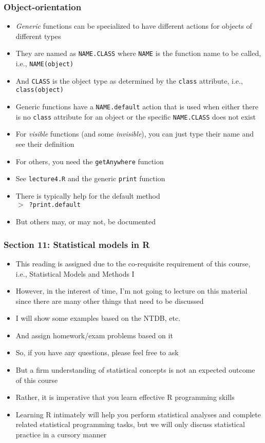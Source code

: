 \documentclass[11pt,pdftex,dvipsnames,usenames,helvetica]{beamer}
\begin{document}
\begin{frame}
\frametitle{Object-orientation}

\begin{itemize}
\item {\it Generic} functions can be specialized to have different actions
for objects of different types
\item They are named as {\tt NAME.CLASS} 
where {\tt NAME} is the function name to be called, i.e., {\tt NAME(object)}
\item And {\tt CLASS} is the object type as determined by the {\tt class}
attribute, i.e., {\tt class(object)}
\item Generic functions have a {\tt NAME.default} action that is
  used when either there is no {\tt class} attribute for an object or
  the specific {\tt NAME.CLASS} does not exist
\item For {\it visible} functions (and some {\it invisible}), you can
just type their name and see their definition
\item For others, you need the {\tt getAnywhere} function
\item See {\tt lecture4.R} and the generic {\tt print} function
\item There is typically help for the default method\\
 {\tt $>$ ?print.default}
\item But others may, or may not, be documented
\end{itemize}

\end{frame}

\begin{frame}
\frametitle{Section 11: Statistical models in R}

\begin{itemize}
\item This reading is assigned due to the co-requisite
requirement of this course, i.e., Statistical Models and Methods I
\item However, in the interest of time, I'm not going to lecture on this 
material since there are many other things that need to be discussed
\item I will show some examples based on the NTDB, etc.
\item And assign homework/exam problems based on it
\item So, if you have any questions, please feel free to ask
\item But a firm understanding of statistical concepts is not 
an expected outcome of this course
\item Rather, it is imperative that you learn effective R programming skills
\item Learning R intimately will help you perform statistical
  analyses and complete related statistical programming tasks, but we
  will only discuss statistical practice in a cursory manner
\end{itemize}

\end{frame}
\end{document}
